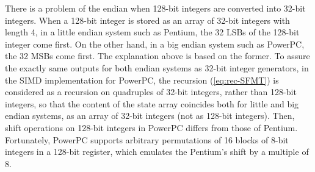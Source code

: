 \documentclass{svmult}
\begin{document}
There is a problem of the endian when 128-bit integers 
are converted into 32-bit integers. When a 128-bit integer
is stored as an array of 32-bit integers with length 4, in a little
endian system such as Pentium, the 32 LSBs of the 128-bit
integer come first.
On the other hand, in a big endian system such as PowerPC,
the 32 MSBs come first. 
The explanation above is based on the former.
To assure the exactly same outputs for both endian systems
as 32-bit integer generators, in the SIMD implementation 
for PowerPC, 
the recursion (\ref{eq:rec-SFMT}) is considered as 
a recursion on quadruples of 32-bit integers, rather than
128-bit integers, so that the content of the state array 
coincides both for little and big endian systems,
as an array of 32-bit integers (not as 128-bit integers).
Then, shift operations on 128-bit integers
in PowerPC differs from those of Pentium. 
Fortunately, 
PowerPC supports arbitrary permutations of 
16 blocks of 8-bit integers in a 128-bit register,
which emulates the Pentium's shift by a multiple of 8.



\end{document}
